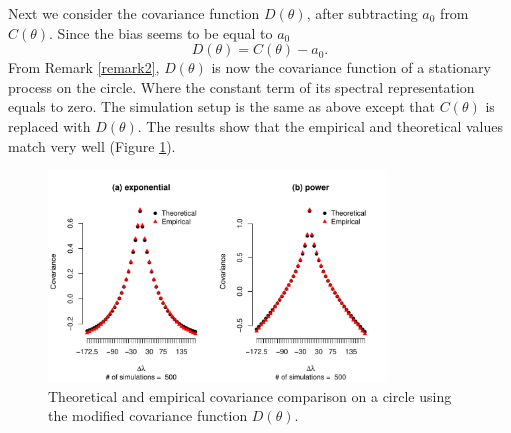Next we consider the covariance function $D(\theta)$, after subtracting $a_0$ from $C(\theta)$. Since the bias seems to be equal to $a_0$
	      \[
	      	D(\theta) = C(\theta) - a_0.
	      \]
From Remark \ref{remark2}, $D(\theta)$ is now the covariance function of a stationary process on the circle. Where the constant term of its spectral representation equals to zero. The simulation setup is the same as above except that $C(\theta)$ is replaced with $D(\theta)$. The results show that the empirical and theoretical values match very well (Figure \ref{covariance_remove_a0}). 

\vskip 8pt

	      \begin{figure}
	      	\centering
	      	\includegraphics[width=0.8\textwidth]{graphs/covarince_circle_remove_a0}
	      	\caption[Theoretical and Empirical Covariance Comparison on a Circle Using The]{Theoretical and empirical covariance comparison on a circle using the modified covariance function $D(\theta)$.}
	      	\label{covariance_remove_a0}
	      \end{figure}

